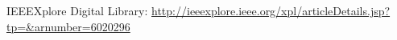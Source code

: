 \documentclass[a4paper,12pt]{article}
\newcommand{\doi}[1]{DOI: \href{http://dx.doi.org/#1}{#1}}
\begin{document}
\thispagestyle{empty}

\vspace{3cm}

\nocite{FDB-c-14}
\printbibliography


\vspace{1.5cm}
IEEEXplore Digital Library:
\url{http://ieeexplore.ieee.org/xpl/articleDetails.jsp?tp=&arnumber=6020296}

\newpage

\end{document}
